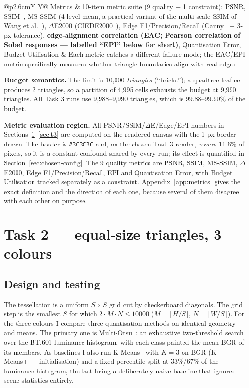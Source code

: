\documentclass[11pt,a4paper]{article}
\begin{document}
\begin{table}[htbp]
\begin{tabularx}{\textwidth}{@{}p{2.6cm}Y Y@{}}
Metrics
  & 10-item metric suite (9 quality + 1 constraint): PSNR, SSIM~\cite{wang2004ssim}, MS-SSIM (4-level mean, a practical variant of the multi-scale SSIM of Wang et al.~\cite{wang2003msssim}), $\Delta$E2000 (CIEDE2000~\cite{sharma2005ciede2000}), Edge F1/Precision/Recall (Canny~\cite{canny1986} + 3-px tolerance), \textbf{edge-alignment correlation (EAC; Pearson correlation of Sobel responses --- labelled ``EPI'' below for short)}, Quantisation Error, Budget Utilisation
  & Each metric catches a different failure mode; the EAC/EPI metric specifically measures whether triangle boundaries align with real edges\\
\bottomrule
\end{tabularx}
\caption{Design decisions of the shared geometry/colour/rendering toolkit.}
\label{tab:toolkit}
\end{table}

\textbf{Budget semantics.} The limit is 10{,}000 \emph{triangles} (``bricks''); a
quadtree leaf cell produces 2 triangles, so a partition of 4{,}995 cells
exhausts the budget at 9{,}990 triangles. All Task 3 runs use
9{,}988--9{,}990 triangles, which is 99.88--99.90\% of the budget.

\textbf{Metric evaluation region.} All PSNR/SSIM/$\Delta$E/Edge/EPI numbers in
Sections~\ref{sec:t2}--\ref{sec:t3} are computed on the rendered canvas with the
1-px border drawn. The border is \texttt{\#3C3C3C} and, on the chosen Task 3
render, covers 11.6\% of pixels, so it is a constant confound shared by every
run; its effect is quantified in Section~\ref{sec:chosen-config}. The 9 quality
metrics are PSNR, SSIM, MS-SSIM, $\Delta$E2000, Edge F1/Precision/Recall, EPI
and Quantisation Error, with Budget Utilisation tracked separately as a
constraint. Appendix~\ref{app:metrics} gives the exact definition and the
direction of each one, because several of them disagree with each other on
purpose.

\FloatBarrier
\FloatBarrier
\section{Task 2 --- equal-size triangles, 3 colours}
\label{sec:t2}

\FloatBarrier
\FloatBarrier
\subsection{Design and testing}

The tessellation is a uniform $S\times S$ grid cut by checkerboard diagonals. The
grid step is the smallest $S$ for which $2\cdot M\cdot N \leq 10000$
($M=\lceil H/S\rceil$, $N=\lceil W/S\rceil$). For the three colours I compare
three quantisation methods on identical geometry and means. The primary one is
Multi-Otsu~\cite{otsu1979}: an exhaustive two-threshold search over the BT.601 luminance
histogram, with each class painted the mean BGR of its members. As baselines I
also run K-Means~\cite{lloyd1982} with $K=3$ on BGR (K-Means++~\cite{arthur2007kmeans} initialisation) and a fixed
percentile split at 33\%/67\% of the luminance histogram, the last being a
deliberately naive baseline that ignores scene statistics entirely.
\end{document}
